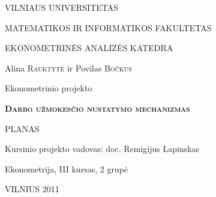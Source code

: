 \documentclass[12pt,a4paper]{article}
\theoremstyle{change}\newtheorem{salyga}{Uždavinys}
\begin{document}
\begin{titlepage}
\centerline{ \large VILNIAUS UNIVERSITETAS}
\bigskip
\centerline{\large MATEMATIKOS IR INFORMATIKOS FAKULTETAS}
\smallskip

\centerline{\large  EKONOMETRINĖS ANALIZĖS KATEDRA}
\vskip 200pt
\centerline{ \large Alina \textsc{Rauktytė} ir Povilas \textsc{Bočkus}}
\vskip 50pt
\centerline{\Large Ekonometrinio projekto}
\vskip 25pt
\centerline{\bf \Large \textsc{Darbo užmokesčio nustatymo mechanizmas}}
\vskip 25pt
\centerline{\Large PLANAS}
\bigskip
\vskip 50pt
\begin{flushright}
 Kursinio projekto vadovas: 
 doc. Remigijus Lapinskas
\end{flushright}
\hfill Ekonometrija, III kursas, 2 grupė
\vskip 150pt
\centerline{\large VILNIUS 2011}
\end{titlepage}
\end{document}
